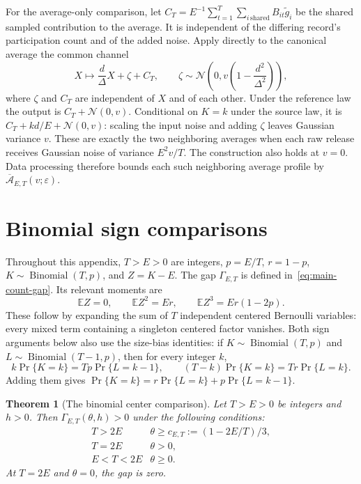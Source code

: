 \documentclass[11pt]{article}
\newtheorem{theorem}{Theorem}[section]
\theoremstyle{remark}
\newcommand{\E}{\mathbb E}
\newcommand{\Normal}{\mathcal N}
\begin{document}
For the average-only comparison, let
$C_T=E^{-1}\sum_{t=1}^T\sum_{i\,\mathrm{shared}} B_{it}\widetilde g_i$
be the shared sampled contribution to the average. It is independent of
the differing record's participation count and of the added noise. Apply
directly to the canonical average the common channel
\[
 X\longmapsto\frac d\Delta X+\zeta+C_T,\qquad
 \zeta\sim\Normal\!\left(0,v\left(1-\frac{d^2}{\Delta^2}\right)\right),
\]
where $\zeta$ and $C_T$ are independent of $X$ and of each other. Under the
reference law the output is $C_T+\Normal(0,v)$. Conditional on $K=k$ under
the source law, it is $C_T+kd/E+\Normal(0,v)$: scaling the input noise and
adding $\zeta$ leaves Gaussian variance $v$. These are exactly the two
neighboring averages when each raw release receives Gaussian noise of
variance $E^2v/T$. The construction
also holds at $v=0$. Data processing therefore bounds each such neighboring
average profile by $\overline{\mathcal A}_{E,T}(v;\varepsilon)$.

\section{Binomial sign comparisons}\label{app:binomial-signs}
Throughout this appendix, $T>E>0$ are integers,
$p=E/T$, $r=1-p$, $K\sim\operatorname{Binomial}(T,p)$, and $Z=K-E$.
The gap $\Gamma_{E,T}$ is defined in~\eqref{eq:main-count-gap}. Its relevant
moments are
\begin{equation}\label{eq:binomial-moments}
 \E Z=0,\qquad \E Z^2=Er,\qquad \E Z^3=Er(1-2p).
\end{equation}
These follow by expanding the sum of $T$ independent centered Bernoulli
variables: every mixed term containing a singleton centered factor vanishes.
Both sign arguments below also use the size-bias identities: if
$K\sim\operatorname{Binomial}(T,p)$ and $L\sim\operatorname{Binomial}(T-1,p)$,
then for every integer $k$,
\begin{equation}\label{eq:binomial-size-bias}
 k\Pr\{K=k\}=Tp\Pr\{L=k-1\},\qquad
 (T-k)\Pr\{K=k\}=Tr\Pr\{L=k\}.
\end{equation}
Adding them gives
$\Pr\{K=k\}=r\Pr\{L=k\}+p\Pr\{L=k-1\}$.

\begin{theorem}[The binomial center comparison]\label{thm:rate-adaptive-center}
Let $T>E>0$ be integers and $h>0$. Then
$\Gamma_{E,T}(\theta,h)>0$ under the following conditions:
\begin{equation}\label{eq:rate-adaptive-center-condition}
 \begin{array}{c|c}
 T>2E & \theta\geq c_{E,T}:=(1-2E/T)/3,\\
 T=2E & \theta>0,\\
 E<T<2E & \theta\geq0.
 \end{array}
\end{equation}
At $T=2E$ and $\theta=0$, the gap is zero.
\end{theorem}
\end{document}
